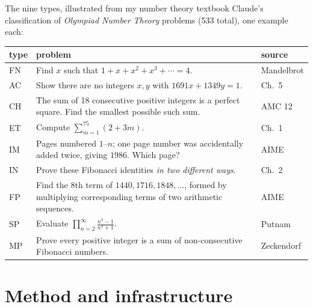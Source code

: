 \documentclass[10pt,aspectratio=169]{beamer}
\begin{document}
\begin{frame}{The nine types, illustrated from my number theory textbook}
  Claude's classification of \emph{Olympiad Number Theory} problems (533 total), one example each:
  \begin{center}
    \footnotesize
    \begin{tabular}{lp{}l}
      \toprule
      type & problem & source \\
      \midrule
      FN & Find $x$ such that $1+x+x^2+x^3+\cdots=4$. & Mandelbrot \\
      AC & Show there are no integers $x,y$ with $1691x+1349y=1$. & Ch.\ 5 \\
      CH & The sum of 18 consecutive positive integers is a perfect square. Find the smallest possible such sum. & AMC 12 \\
      ET & Compute $\sum_{m=1}^{75}(2+3m)$. & Ch.\ 1 \\
      IM & Pages numbered $1$--$n$; one page number was accidentally added twice, giving $1986$. Which page? & AIME \\
      IN & Prove these Fibonacci identities \emph{in two different ways}. & Ch.\ 2 \\
      FP & Find the 8th term of $1440, 1716, 1848,\ldots$, formed by multiplying corresponding terms of two arithmetic sequences. & AIME \\
      SP & Evaluate $\prod_{n=2}^{\infty}\frac{n^3-1}{n^3+1}$. & Putnam \\
      MP & Prove every positive integer is a sum of non-consecutive Fibonacci numbers. & Zeckendorf \\
      \bottomrule
    \end{tabular}
  \end{center}
\end{frame}

\section{Method and infrastructure}
\end{document}
